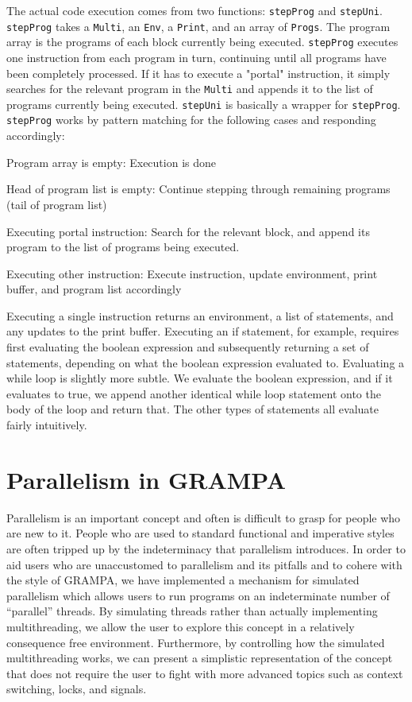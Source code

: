 \documentclass[preprint]{sigplanconf}
\begin{document}
The actual code execution comes from two functions: \texttt{stepProg} and \texttt{stepUni}. \texttt{stepProg} takes a \texttt{Multi}, an \texttt{Env}, a \texttt{Print}, and an array of \texttt{Progs}. The program array is the programs of each block currently being executed. \texttt{stepProg} executes one instruction from each program in turn, continuing until all programs have been completely processed. If it has to execute a "portal" instruction, it simply searches for the relevant program in the \texttt{Multi} and appends it to the list of programs currently being executed. \texttt{stepUni} is basically a wrapper for \texttt{stepProg}. \texttt{stepProg} works by pattern matching for the following cases and responding accordingly:
\begin{description}
	\item{Program array is empty: } Execution is done
	\item{Head of program list is empty: } Continue stepping through remaining programs (tail of program list)
	\item{Executing portal instruction: } Search for the relevant block, and append its program to the list of programs being executed.
	\item{Executing other instruction: } Execute instruction, update environment, print buffer, and program list accordingly
\end{description}

Executing a single instruction returns an environment, a list of statements, and any updates to the print buffer. Executing an if statement, for example, requires first evaluating the boolean expression and subsequently returning a set of statements, depending on what the boolean expression evaluated to. Evaluating a while loop is slightly more subtle. We evaluate the boolean expression, and if it evaluates to true, we append another identical while loop statement onto the body of the loop and return that. The other types of statements all evaluate fairly intuitively.

\section{Parallelism in GRAMPA}
Parallelism is an important concept and often is difficult to grasp for people who are new to it. People who are used to standard functional and imperative styles are often tripped up by the indeterminacy that parallelism introduces. In order to aid users who are unaccustomed to parallelism and its pitfalls and to cohere with the style of GRAMPA, we have implemented a mechanism for simulated parallelism which allows users to run programs on an indeterminate number of “parallel” threads. By simulating threads rather than actually implementing multithreading, we allow the user to explore this concept in a relatively consequence free environment. Furthermore, by controlling how the simulated multithreading works, we can present a simplistic representation of the concept that does not require the user to fight with more advanced topics such as context switching, locks, and signals.
	
\end{document}
